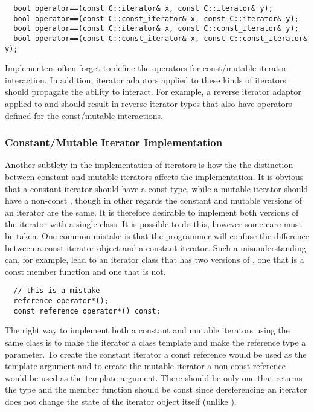 \documentclass{netobjectdays}
\begin{document}
{\footnotesize
\begin{verbatim}
  bool operator==(const C::iterator& x, const C::iterator& y);
  bool operator==(const C::const_iterator& x, const C::iterator& y);
  bool operator==(const C::iterator& x, const C::const_iterator& y);
  bool operator==(const C::const_iterator& x, const C::const_iterator& y);
\end{verbatim}
}

Implementers often forget to define the operators for const/mutable
iterator interaction. In addition, iterator adaptors applied to these
kinds of iterators should propagate the ability to interact. For
example, a reverse iterator adaptor applied to  and
 should result in reverse iterator types that
also have operators defined for the const/mutable interactions.


\subsubsection{Constant/Mutable Iterator Implementation}

Another subtlety in the implementation of iterators is how the the
distinction between constant and mutable iterators affects the
implementation. It is obvious that a constant iterator should have a
const  type, while a mutable iterator should have a
non-const , though in other regards the constant and
mutable versions of an iterator are the same. It is therefore
desirable to implement both versions of the iterator with a single
class. It is possible to do this, however some care must be taken.
One common mistake is that the programmer will confuse the difference
between a const iterator object and a constant iterator. Such a
misunderstanding can, for example, lead to an iterator class that has
two versions of , one that is a const member function
and one that is not.
 
{\footnotesize
\begin{verbatim}
  // this is a mistake
  reference operator*();
  const_reference operator*() const;
\end{verbatim}
}

The right way to implement both a constant and mutable iterators using
the same class is to make the iterator a class template and make the
reference type a parameter. To create the constant iterator a const
reference would be used as the template argument and to create the
mutable iterator a non-const reference would be used as the template
argument. There should be only one  that returns the
 type and the member function should be const since
dereferencing an iterator does not change the state of the iterator
object itself (unlike ).
\end{document}
